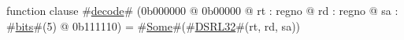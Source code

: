 function clause #\hyperref[zdecode]{decode}# (0b000000 @ 0b00000 @ rt : regno @ rd : regno @ sa : #\hyperref[zbits]{bits}#(5) @ 0b111110) =
  #\hyperref[zSome]{Some}#(#\hyperref[zDSRLthreetwo]{DSRL32}#(rt, rd, sa))
